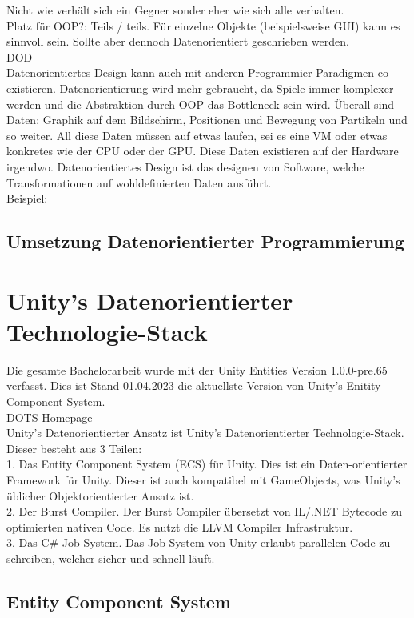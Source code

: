 \documentclass[12pt, titlepage]{article}
\begin{document}
Nicht wie verhält sich ein Gegner sonder eher wie sich alle verhalten.\\Platz für OOP?: Teils / teils. Für einzelne Objekte (beispielsweise GUI) kann es sinnvoll sein. Sollte aber dennoch Datenorientiert geschrieben werden.
\\ DOD \cite{DOD}\\
Datenorientiertes Design kann auch mit anderen Programmier Paradigmen co-existieren. Datenorientierung wird mehr gebraucht, da Spiele immer komplexer werden und die Abstraktion durch OOP das Bottleneck sein wird. Überall sind Daten: Graphik auf dem Bildschirm, Positionen und Bewegung von Partikeln und so weiter. All diese Daten müssen auf etwas laufen, sei es eine VM oder etwas konkretes wie der CPU oder der GPU. Diese Daten existieren auf der Hardware irgendwo. Datenorientiertes Design ist das designen von Software, welche Transformationen auf wohldefinierten Daten ausführt. \\
Beispiel:
\subsection{Umsetzung Datenorientierter Programmierung}
\newpage
\section{Unity's Datenorientierter Technologie-Stack}
Die gesamte Bachelorarbeit wurde mit der Unity Entities Version 1.0.0-pre.65 verfasst. Dies ist Stand 01.04.2023 die aktuellste Version von Unity's Enitity Component System.\\
\href{https://unity.com/de/dots}{DOTS Homepage} \\
Unity's Datenorientierter Ansatz ist Unity's Datenorientierter Technologie-Stack. Dieser besteht aus 3 Teilen:\\
1. Das Entity Component System (ECS) für Unity. Dies ist ein Daten-orientierter Framework für Unity. Dieser ist auch kompatibel mit GameObjects, was Unity's üblicher Objektorientierter Ansatz ist.\\2. Der Burst Compiler. Der Burst Compiler übersetzt von IL/.NET Bytecode zu optimierten nativen Code. Es nutzt die LLVM Compiler Infrastruktur.\\3. Das C\# Job System. Das Job System von Unity erlaubt parallelen Code zu schreiben, welcher sicher und schnell läuft.
\subsection{Entity Component System}
\end{document}

